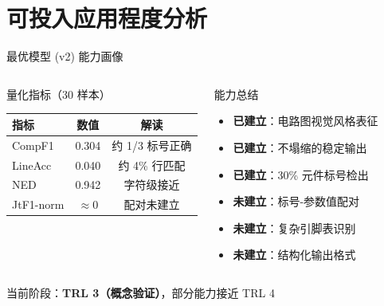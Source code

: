 \documentclass[10pt,aspectratio=169,table]{beamer}
\begin{document}
\section{可投入应用程度分析}

\begin{frame}{最优模型 (v2) 能力画像}
  \begin{columns}[T]
      \begin{block}{量化指标（30 样本）}
        \footnotesize
        \begin{tabular}{lcc}
          \toprule
          \textbf{指标} & \textbf{数值} & \textbf{解读} \\
          \midrule
          CompF1 & 0.304 & 约 1/3 标号正确 \\
          LineAcc & 0.040 & 约 4\% 行匹配 \\
          NED & 0.942 & 字符级接近 \\
          JtF1-norm & $\approx$0 & 配对未建立 \\
          \bottomrule
        \end{tabular}
      \end{block}
      \begin{block}{能力总结}
        \footnotesize
        \begin{itemize}
          \item \textcolor{mygreen}{\textbf{已建立}}：电路图视觉风格表征
          \item \textcolor{mygreen}{\textbf{已建立}}：不塌缩的稳定输出
          \item \textcolor{mygreen}{\textbf{已建立}}：30\% 元件标号检出
          \item \textcolor{sysured}{\textbf{未建立}}：标号-参数值配对
          \item \textcolor{sysured}{\textbf{未建立}}：复杂引脚表识别
          \item \textcolor{sysured}{\textbf{未建立}}：结构化输出格式
        \end{itemize}
      \end{block}
  \end{columns}
  \vspace{0.3cm}
  \begin{center}
    \large 当前阶段：\textbf{TRL 3（概念验证）}，部分能力接近 TRL 4
  \end{center}
\end{frame}
\end{document}
